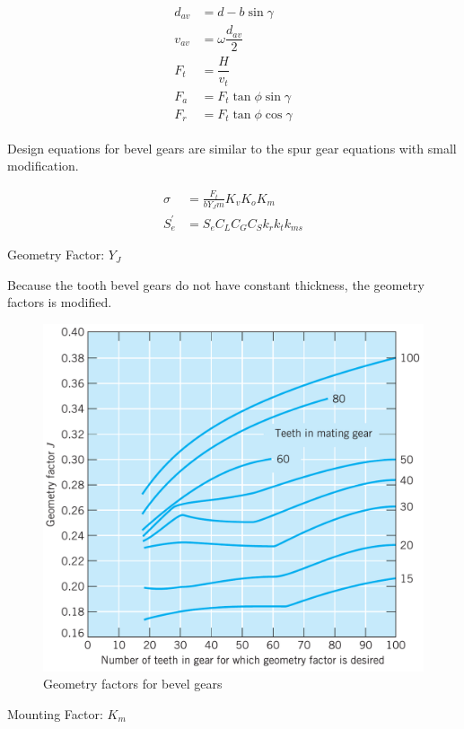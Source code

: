 \documentclass[a4paper,openany]{tufte-book}
\begin{document}
\begin{align}
  \begin{array}{ll}
    d_{av} &= d - b \sin \gamma \\
    v_{av} &= \omega \dfrac{d_{av}}{2} \\
    F_{t} &= \dfrac{H}{v_t} \\
    F_{a} &= F_{t} \tan \phi \sin \gamma \\
    F_{r} &= F_{t} \tan \phi \cos \gamma
  \end{array}
\end{align}

Design equations for bevel gears are similar to the spur gear equations with small modification.

\begin{align}
    \sigma &= \frac{F_{t}}{bY_{J}m} K_{v} K_{o} K_{m} \\
    S_{e}^{\prime} &= S_{e}C_{L}C_{G}C_{S}k_{r}k_{t}k_{ms}
  \end{align}

Geometry Factor: \(Y_{J}\)

Because the tooth bevel gears do not have constant thickness, the geometry factors is modified.

\begin{figure}[htbp]
\centering
\includegraphics[width=.9\linewidth]{./pictures/Gears/geometry-factor-bevel.png}
\caption{\label{fig: geometry factor bevel}Geometry factors for bevel gears}
\end{figure}

Mounting Factor: \(K_{m}\)
\end{document}
